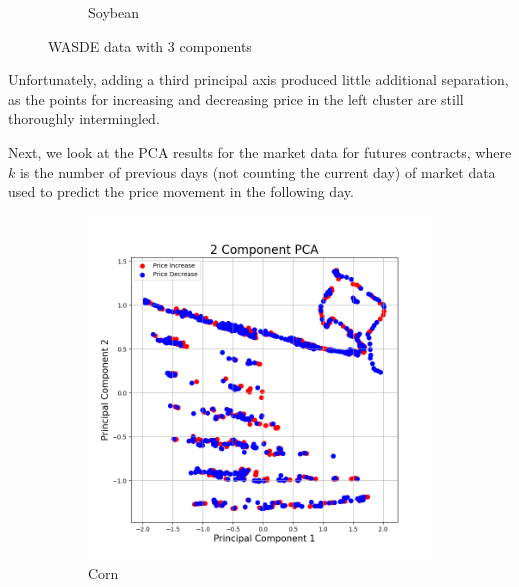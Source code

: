 \documentclass{article}
\begin{document}
\begin{figure}[h!]
\begin{subfigure}{.5\textwidth}
\caption{Soybean}
\end{subfigure}
\caption{WASDE data with 3 components}
\end{figure}

Unfortunately, adding a third principal axis produced little additional separation, as the points for increasing and decreasing price in the left cluster are still thoroughly intermingled.

Next, we look at the PCA results for the market data for futures contracts, where $k$ is the number of previous days (not counting the current day) of market data used to predict the price movement in the following day.

\begin{figure}[h!]
\centering
\begin{subfigure}{.5\textwidth}
  \centering
  \includegraphics[scale=.3]{imagesmid/cornmkt5}
\caption{Corn}
\end{subfigure}%
\begin{subfigure}{.5\textwidth}
  \centering

\end{subfigure}
\end{figure}
\end{document}
